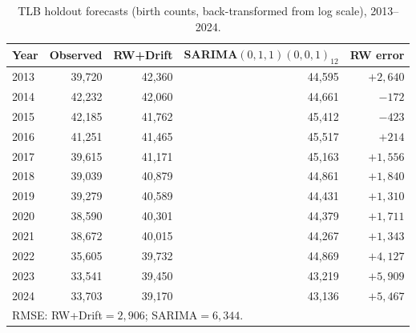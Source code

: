 \documentclass[12pt,a4paper]{article}
\begin{document}
\begin{table}[H]
\centering
\caption{TLB holdout forecasts (birth counts, back-transformed from log scale),
         2013--2024.}
\label{tab:fc_tlb_zy}
\begin{tabular}{lrrrr}
\toprule
Year & Observed & RW+Drift & SARIMA$(0,1,1)(0,0,1)_{12}$ & RW error \\
\midrule
2013 & 39{,}720 & 42{,}360 & 44{,}595 & $+2{,}640$ \\
2014 & 42{,}232 & 42{,}060 & 44{,}661 & $-172$ \\
2015 & 42{,}185 & 41{,}762 & 45{,}412 & $-423$ \\
2016 & 41{,}251 & 41{,}465 & 45{,}517 & $+214$ \\
2017 & 39{,}615 & 41{,}171 & 45{,}163 & $+1{,}556$ \\
2018 & 39{,}039 & 40{,}879 & 44{,}861 & $+1{,}840$ \\
2019 & 39{,}279 & 40{,}589 & 44{,}431 & $+1{,}310$ \\
2020 & 38{,}590 & 40{,}301 & 44{,}379 & $+1{,}711$ \\
2021 & 38{,}672 & 40{,}015 & 44{,}267 & $+1{,}343$ \\
2022 & 35{,}605 & 39{,}732 & 44{,}869 & $+4{,}127$ \\
2023 & 33{,}541 & 39{,}450 & 43{,}219 & $+5{,}909$ \\
2024 & 33{,}703 & 39{,}170 & 43{,}136 & $+5{,}467$ \\
\midrule
\multicolumn{5}{l}{RMSE: RW+Drift$=2{,}906$; SARIMA$=6{,}344$.}\\
\end{tabular}
\end{table}
\end{document}
